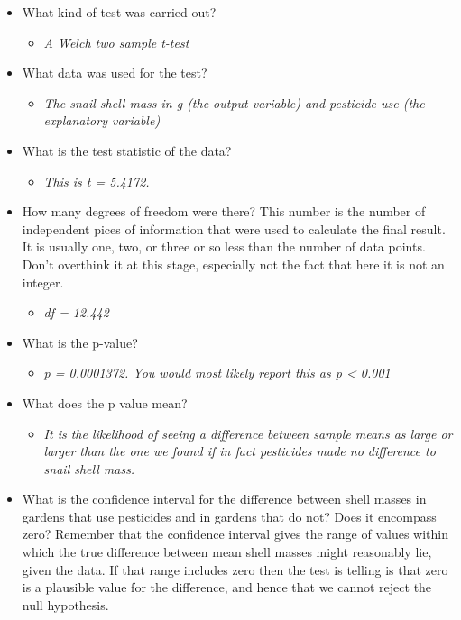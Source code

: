 \documentclass[
  letterpaper,
  DIV=11,
  numbers=noendperiod]{scrreprt}
\providecommand{\tightlist}{%
  \setlength{\itemsep}{0pt}\setlength{\parskip}{0pt}}\usepackage{longtable,booktabs,array}
\begin{document}
\begin{itemize}
\tightlist
\item
  What kind of test was carried out?

  \begin{itemize}
  \tightlist
  \item
    \emph{A Welch two sample t-test}
  \end{itemize}
\item
  What data was used for the test?

  \begin{itemize}
  \tightlist
  \item
    \emph{The snail shell mass in g (the output variable) and pesticide
    use (the explanatory variable)}
  \end{itemize}
\item
  What is the test statistic of the data?

  \begin{itemize}
  \tightlist
  \item
    \emph{This is t = 5.4172.}
  \end{itemize}
\item
  How many degrees of freedom were there? This number is the number of
  independent pices of information that were used to calculate the final
  result. It is usually one, two, or three or so less than the number of
  data points. Don't overthink it at this stage, especially not the fact
  that here it is not an integer.

  \begin{itemize}
  \tightlist
  \item
    \emph{df = 12.442}
  \end{itemize}
\item
  What is the p-value?

  \begin{itemize}
  \tightlist
  \item
    \emph{p = 0.0001372. You would most likely report this as p
    \textless{} 0.001}
  \end{itemize}
\item
  What does the p value mean?

  \begin{itemize}
  \tightlist
  \item
    \emph{It is the likelihood of seeing a difference between sample
    means as large or larger than the one we found if in fact pesticides
    made no difference to snail shell mass.}
  \end{itemize}
\item
  What is the confidence interval for the difference between shell
  masses in gardens that use pesticides and in gardens that do not? Does
  it encompass zero? Remember that the confidence interval gives the
  range of values within which the true difference between mean shell
  masses might reasonably lie, given the data. If that range includes
  zero then the test is telling is that zero is a plausible value for
  the difference, and hence that we cannot reject the null hypothesis.


\end{itemize}
\end{document}
